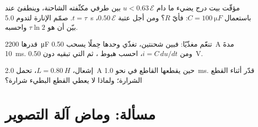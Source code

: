 \begin{exercise}[$\star\star\star$]\label{exo:g12:rc-rl-circuits:13}
مؤقّت بيت درج يضيء ما دام $u < 0.63\,\mathcal{E}$ بين طرفي مكثّفته
الشاحنة، وينطفئ عند $t = \tau$. صمّم الإنارة لتدوم
\qty{5.0}{s} باستعمال $C = \qty{100}{\micro F}$: فأيّ $R$؟ ومن أجل عتبة
$0.50\,\mathcal{E}$، بيّن أن  هو $\tau \ln 2$ واحسبه.
\end{exercise}

\begin{exercise}[$\star\star\star$]\label{exo:g12:rc-rl-circuits:14}
 قدرها \qty{2200}{\micro F} تنعّم مغذّيًا: فبين شحنتين،
تغذّي وحدها حِملًا يسحب \qty{0.50}{A} مدةَ \qty{10}{ms}. ومن
$i = C\,du/dt$، احسب هبوط ، ثم  التي
تبقيه دون \qty{0.50}{V}.
\end{exercise}

\begin{exercise}[$\star\star\star$]\label{exo:g12:rc-rl-circuits:15}
 إشعال، $L = \qty{0.80}{H}$، تحمل \qty{2.0}{A} حين
يقطعها القاطع في نحو \qty{1.0}{ms}. قدّر  
أثناء القطع  الشرارة؛ ولماذا لا يعطي القطع البطيء
شرارة؟
\end{exercise}

\section{مسألة: وماض آلة التصوير}

